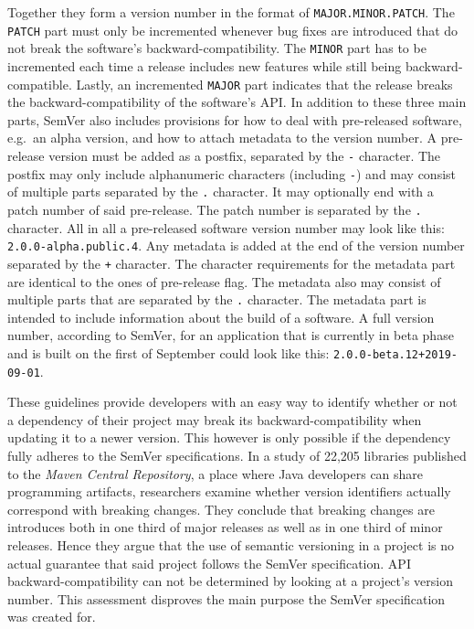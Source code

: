 Together they form a version number in the format of
\texttt{MAJOR.MINOR.PATCH}. The \texttt{PATCH} part must only be incremented
whenever bug fixes are introduced that do not break the software's
backward-compatibility. The \texttt{MINOR} part has to be incremented each
time a release includes new features while still being backward-compatible.
Lastly, an incremented \texttt{MAJOR} part indicates that the release breaks
the backward-compatibility of the software's \ac{API}. In addition to these
three main parts, SemVer also includes provisions for how to deal with
pre-released software, e.g.\ an alpha version, and how to attach metadata to
the version number. A pre-release version must be added as a postfix,
separated by the \texttt{-} character. The postfix may only include
alphanumeric characters (including \texttt{-}) and may consist of multiple
parts separated by the \texttt{.} character. It may optionally end with a patch
number of said pre-release. The patch number is separated by the \texttt{.}
character. All in all a pre-released software version number may look like
this: \texttt{2.0.0-alpha.public.4}. Any metadata is added at the end of the
version number separated by the \texttt{+} character. The character
requirements for the metadata part are identical to the ones of pre-release
flag. The metadata also may consist of multiple parts that are separated by the
\texttt{.} character. The metadata part is intended to include information
about the build of a software. A full version number, according to SemVer, for
an application that is currently in beta phase and is built on the first of
September could look like this: \texttt{2.0.0-beta.12+2019-09-01}.

These guidelines provide developers with an easy way to identify whether or not
a dependency of their project may break its backward-compatibility when
updating it to a newer version. This however is only possible if the dependency
fully adheres to the SemVer specifications. In a study
\autocite{RaemaekersSemanticVersioningversus2014} of 22,205 libraries published
to the \textit{Maven Central Repository}, a place where Java developers can
share programming artifacts, researchers examine whether version identifiers
actually correspond with breaking changes. They conclude that breaking changes
are introduces both in one third of major releases as well as in one third of
minor releases. Hence they argue that the use of semantic versioning in a
project is no actual guarantee that said project follows the SemVer
specification. \ac{API} backward-compatibility can not be determined by looking
at a project's version number. This assessment disproves the main purpose the
SemVer specification was created for.

